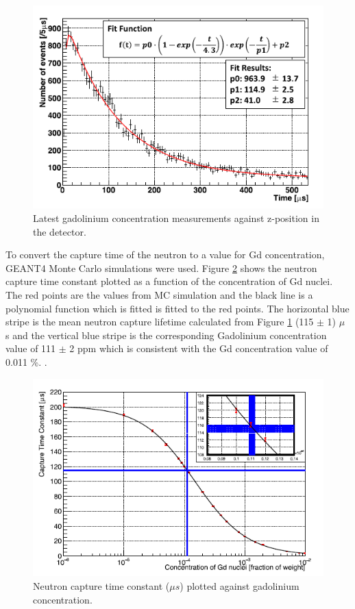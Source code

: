 \begin{figure}[H]
    \includegraphics[width=\textwidth]{Figures/ambe_time.png}
    \caption{Latest gadolinium concentration measurements against z-position in the detector.}
    \label{fig:ambe_time}
\end{figure}

To convert the capture time of the neutron to a value for Gd concentration, GEANT4 Monte Carlo simulations were used. Figure \ref{fig:capturetime_gdconc} shows the neutron capture time constant plotted as a function of the concentration of Gd nuclei. The red points are the values from MC simulation and the black line is a polynomial function which is fitted is fitted to the red points. The horizontal blue stripe is the mean neutron capture lifetime calculated from Figure \ref{fig:ambe_time} (115 $\pm$ 1) $\mu$ s and the vertical blue stripe is the corresponding Gadolinium concentration value of 111 $\pm$ 2 ppm which is consistent with the Gd concentration value of 0.011 \%. \cite{abeFirstGadoliniumLoading2021}.

\begin{figure}[H]
    \includegraphics[width=\textwidth]{Figures/capturetime_gdconc.png}
    \caption{Neutron capture time constant ($\mu s$) plotted against gadolinium concentration.}
    \label{fig:capturetime_gdconc}
\end{figure}


